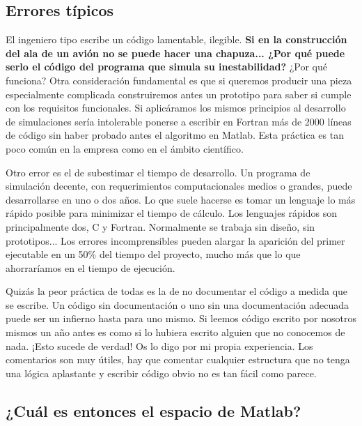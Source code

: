 \subsection{Errores típicos}

El ingeniero tipo escribe un código lamentable, ilegible.
\textbf{Si en la construcción del ala de un
avión no se puede hacer una chapuza... ¿Por qué puede serlo el código
del programa que simula su inestabilidad?} ¿Por qué funciona? Otra
consideración fundamental es que si queremos producir una pieza
especialmente complicada construiremos antes un prototipo para saber
si cumple con los requisitos funcionales.  Si aplicáramos los mismos
principios al desarrollo de simulaciones sería intolerable ponerse a
escribir en Fortran más de 2000 líneas de código sin haber probado
antes el algoritmo en Matlab. Esta práctica es tan poco común en la
empresa como en el ámbito científico.

Otro error es el de subestimar el tiempo de desarrollo. Un programa de
simulación decente, con requerimientos computacionales medios o
grandes, puede desarrollarse en uno o dos años. Lo que suele hacerse
es tomar un lenguaje lo más rápido posible para minimizar el tiempo de
cálculo. Los lenguajes rápidos son principalmente dos, C y Fortran.
Normalmente se trabaja sin diseño, sin prototipos... Los errores
incomprensibles pueden alargar la aparición del primer ejecutable en
un 50\% del tiempo del proyecto, mucho más que lo que ahorraríamos en
el tiempo de ejecución.

Quizás la peor práctica de todas es la de no documentar el código a
medida que se escribe. Un código sin documentación o uno sin una
documentación adecuada puede ser un infierno hasta para uno mismo.  Si
leemos código escrito por nosotros mismos un año antes es como si lo
hubiera escrito alguien que no conocemos de nada. ¡Esto sucede de
verdad! Os lo digo por mi propia experiencia. Los comentarios son muy
útiles, hay que comentar cualquier estructura que no tenga una lógica
aplastante y escribir código obvio no es tan fácil como parece.


\subsection{¿Cuál es entonces el espacio de Matlab?}

